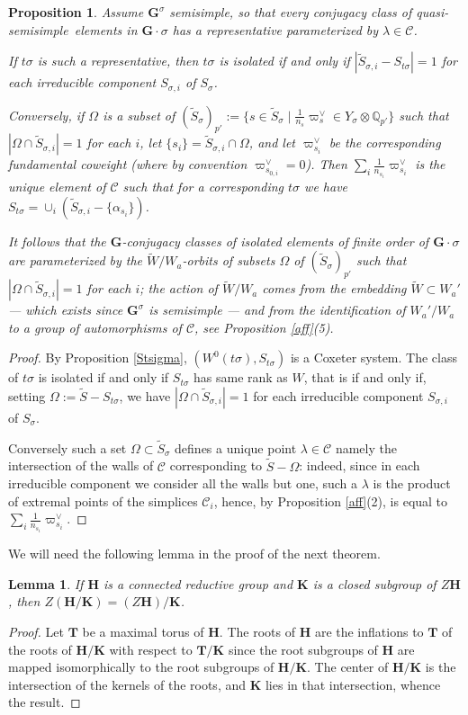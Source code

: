 \documentclass{amsart}
\newtheorem{lemma}[equation]{Lemma}
\newtheorem{proposition}[equation]{Proposition}
\numberwithin{equation}{section}
\theoremstyle{definition}
\theoremstyle{remark}
\newcommand\bG{{\mathbf G}}
\newcommand\bH{{\mathbf H}}
\newcommand\bK{{\mathbf K}}
\newcommand\bT{{\mathbf T}}
\newcommand\BQ{{\mathbb Q}}
\newcommand\CC{{\mathcal C}}
\newcommand\Gs{{\bG^\sigma}}
\newcommand\tW{{\widetilde W}}
\newcommand\Wa{W_a}
\newcommand\qss{quasi-semisimple}
\begin{document}
\begin{proposition} \label{param isolated} Assume
$\bG^\sigma$ semisimple, so that every conjugacy class of \qss\ elements in
$\bG\cdot\sigma$ has a representative parameterized by $\lambda\in\CC$.

If  $t\sigma$ is such a representative, then
$t\sigma$  is   isolated  if  and  only  if
$|\tilde S_{\sigma,i}-S_{t\sigma}|=1$
for each irreducible component $S_{\sigma,i}$ of $S_\sigma$.

Conversely, if $\Omega$ is a subset of
$(\tilde S_\sigma)_{p'}:=\{s\in\tilde S_\sigma\mid \frac 1{n_s}
\varpi^\vee_s\in Y_\sigma\otimes\BQ_{p'}\}$
such that $|\Omega\cap\tilde S_{\sigma,i}|=1$ for each $i$, let
$\{s_i\}=\tilde S_{\sigma,i}\cap\Omega$, and let $\varpi^\vee_{s_i}$ be
the corresponding fundamental coweight
(where by convention $\varpi_{s_{0,i}}^\vee=0$).
Then $\sum_i\frac1{n_{s_i}}\varpi_{s_i}^\vee$ is the unique element
of $\CC$ such that for a corresponding $t\sigma$ we have
$S_{t\sigma}=\cup_i (\tilde S_{\sigma,i}-\{\alpha_{s_i}\})$.

It follows that the $\bG$-conjugacy classes of isolated elements
of finite order of $\bG\cdot\sigma$ are
parameterized by the $\tW/\Wa$-orbits of 
subsets $\Omega$ of $(\tilde S_\sigma)_{p'}$ such that 
$|\Omega\cap\tilde S_{\sigma,i}|=1$ for each $i$; the action of
$\tW/\Wa$ comes from the embedding $\tW\subset\Wa'$ --- which exists
since $\Gs$ is semisimple ---
and from the identification of $\Wa'/\Wa$ to a group of automorphisms of $\CC$,
see Proposition \ref{aff}(5).
\end{proposition}
\begin{proof}
By Proposition \ref{Stsigma}, $(W^0(t\sigma),S_{t\sigma})$ is a Coxeter system.
The class of $t\sigma$ is isolated if and only if $S_{t\sigma}$ has same rank as
$W$, that is if and only if, setting $\Omega:=\tilde S-S_{t\sigma}$, we have 
$|\Omega\cap\tilde S_{\sigma,i}|=1$
for each irreducible component $S_{\sigma,i}$ of $S_\sigma$.

Conversely such a set $\Omega\subset\tilde S_\sigma$ defines a unique point
$\lambda\in\CC$ namely the intersection of the walls  of $\CC$ corresponding 
to $\tilde S-\Omega$: indeed,
since in each irreducible component we consider all the walls but one,
such a $\lambda$ is the product of extremal points of the simplices $\CC_i$,
hence, by Proposition \ref{aff}(2), is equal to $\sum_i\frac1{n_{s_i}}\varpi_{s_i}^\vee$.
\end{proof}
We will need the following lemma in the proof of the next theorem.
\begin{lemma} \label{centerquotient}
If $\bH$ is a connected reductive group and $\bK$ is a closed
subgroup of $Z\bH$, then $Z(\bH/\bK)=(Z\bH)/\bK$.
\end{lemma}
\begin{proof}Let $\bT$ be a maximal torus of $\bH$.
The roots of $\bH$ are the inflations to $\bT$ 
of the roots of $\bH/\bK$ with respect to $\bT/\bK$ since the root subgroups 
of $\bH$ are mapped isomorphically to the root subgroups of $\bH/\bK$.
The center of $\bH/\bK$ is the intersection of the kernels of the roots, and
$\bK$ lies in that intersection, whence the result.
\end{proof}
\end{document}
